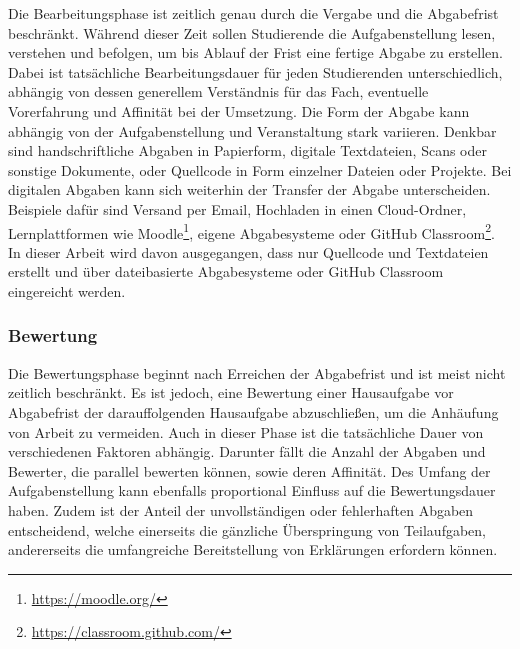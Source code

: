 Die Bearbeitungsphase ist zeitlich genau durch die Vergabe und die Abgabefrist beschränkt.
Während dieser Zeit sollen Studierende die Aufgabenstellung lesen, verstehen und befolgen, um bis Ablauf der Frist eine fertige Abgabe zu erstellen.
Dabei ist tatsächliche Bearbeitungsdauer für jeden Studierenden unterschiedlich, abhängig von dessen generellem Verständnis für das Fach, eventuelle Vorerfahrung und Affinität bei der Umsetzung.
Die Form der Abgabe kann abhängig von der Aufgabenstellung und Veranstaltung stark variieren.
Denkbar sind handschriftliche Abgaben in Papierform, digitale Textdateien, Scans oder sonstige Dokumente, oder Quellcode in Form einzelner Dateien oder Projekte.
Bei digitalen Abgaben kann sich weiterhin der Transfer der Abgabe unterscheiden.
Beispiele dafür sind Versand per Email, Hochladen in einen Cloud-Ordner, Lernplattformen wie Moodle\footnote{\url{https://moodle.org/}}, eigene Abgabesysteme oder GitHub Classroom\footnote{\url{https://classroom.github.com/}}.
In dieser Arbeit wird davon ausgegangen, dass nur Quellcode und Textdateien erstellt und über dateibasierte Abgabesysteme oder GitHub Classroom eingereicht werden.

\subsubsection{Bewertung}

Die Bewertungsphase beginnt nach Erreichen der Abgabefrist und ist meist nicht zeitlich beschränkt.
Es ist jedoch, eine Bewertung einer Hausaufgabe vor Abgabefrist der darauffolgenden Hausaufgabe abzuschließen, um die Anhäufung von Arbeit zu vermeiden.
Auch in dieser Phase ist die tatsächliche Dauer von verschiedenen Faktoren abhängig.
Darunter fällt die Anzahl der Abgaben und Bewerter, die parallel bewerten können, sowie deren Affinität.
Des Umfang der Aufgabenstellung kann ebenfalls proportional Einfluss auf die Bewertungsdauer haben.
Zudem ist der Anteil der unvollständigen oder fehlerhaften Abgaben entscheidend, welche einerseits die gänzliche Überspringung von Teilaufgaben, andererseits die umfangreiche Bereitstellung von Erklärungen erfordern können.

